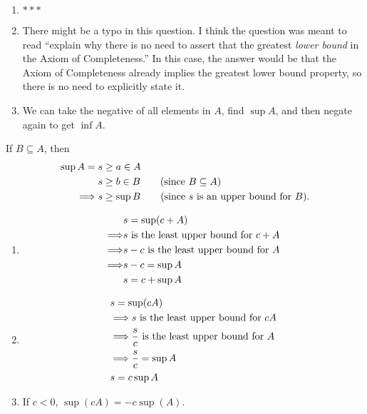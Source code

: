 \begin{exercise}
\begin{enumerate}[label=(\alph*)]
	\item $\ast\ast\ast$
	\item There might be a typo in this question. I think the question was meant to read ``explain why there is no need to assert that the greatest \textit{lower bound} in the Axiom of Completeness.'' In this case, the answer would be that the Axiom of Completeness already implies the greatest lower bound property, so there is no need to explicitly state it.
	\item We can take the negative of all elements in $A$, find $\sup A$, and then negate again to get $\inf A$.
\end{enumerate}
\end{exercise}

\begin{exercise}
	If $B \subseteq A$, then 
	\begin{align*}
		\sup A = s &\geq a \in A \\
			s &\geq b \in B \tag{since $B\subseteq A$} \\
			\Longrightarrow s &\geq \sup B \tag{since $s$ is an upper bound for $B$}.
	\end{align*}
\end{exercise}

\begin{exercise}
	\begin{enumerate}[label=(\alph*)]
		\item \begin{align*}
		&s = \sup(c + A) \\
		\Longrightarrow &s \text{ is the least upper bound for } c + A \\
		\Longrightarrow &s - c \text{ is the least upper bound for } A \\
		\Longrightarrow &s - c = \sup A \\
		&s = c + \sup A
	\end{align*}
		\item \begin{align*}
			&s = \sup(cA) \\
			&\Longrightarrow s \text{ is the least upper bound for } cA \\
			&\Longrightarrow \frac{s}{c} \text{ is the least upper bound for } A \\
			&\Longrightarrow \frac{s}{c} = \sup A \\
			&s = c \sup A
		\end{align*}
		\item If $c < 0$, $\sup(cA) = -c\sup(A)$.
	\end{enumerate}
\end{exercise}

